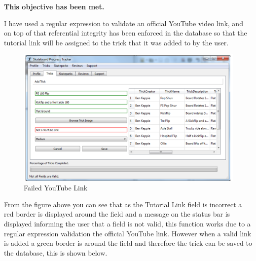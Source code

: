 \textbf{This objective has been met.}

 I have used a regular expression to validate an official YouTube video link, and on top of that referential integrity has been enforced in the database so that the tutorial link will be assigned to the trick that it was added to by the user. 


\begin{figure}[H]
    \includegraphics[width=\textwidth]{./Evaluation/images/FailedYouTubeLink.pdf}
    \caption{Failed YouTube Link} \label{fig:FailedYouTubeLink}
\end{figure}

From the figure above you can see that as the Tutorial Link field is incorrect a red border is displayed around the field and a message on the status bar is displayed informing the user that a field is not valid, this function works due to a regular expression validation the official YouTube link. However when a valid link is added a green border is around the field and therefore the trick can be saved to the database, this is shown below.

